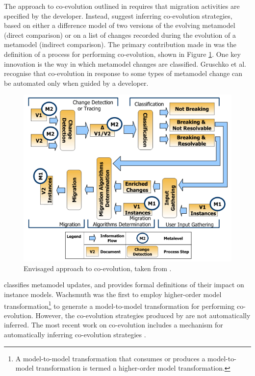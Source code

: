 The approach to co-evolution outlined in \cite{sprinkle04domain} requires that migration activities are specified by the developer. Instead, \cite{gruschko07towards} suggest inferring co-evolution strategies, based on either a difference model of two versions of the evolving metamodel (direct comparison) or on a list of changes recorded during the evolution of a metamodel (indirect comparison). The primary contribution made in \cite{sprinkle04domain} was the definition of a process for performing co-evolution, shown in Figure \ref{fig:coevoprocess}. One key innovation is the way in which metamodel changes are classified. Gruschko et al. recognise that co-evolution in response to some types of metamodel change can be automated only when guided by a developer.

\begin{figure}[htbp]
  \begin{center}
    \leavevmode
    \includegraphics[scale=0.6]{3.LiteratureReview/CoEvoProcess.png}
  \end{center}
  \caption{Envisaged approach to co-evolution, taken from \cite{gruschko07towards}.}
  \label{fig:coevoprocess}
\end{figure}

\cite{wachsmuth07metamodel} classifies metamodel updates, and provides formal definitions of their impact on instance models. Wachsmuth was the first to employ higher-order model transformation\footnote{A model-to-model transformation that consumes or produces a model-to-model transformation is termed a higher-order model transformation.} to generate a model-to-model transformation for performing co-evolution. However, the co-evolution strategies produced by \cite{wachsmuth07metamodel} are not automatically inferred. The most recent work on co-evolution includes a mechanism for automatically inferring co-evolution strategies \cite{cicchetti08automating}.

